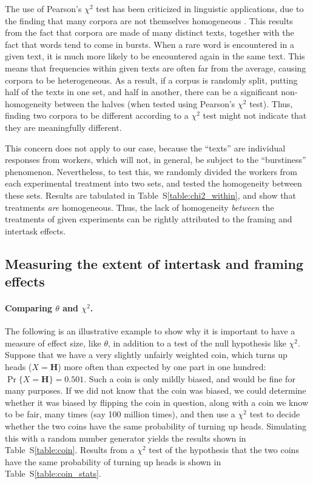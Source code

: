 \documentclass{sigchi}
\begin{document}
The use of Pearson's $\chi^2$ test has been criticized in linguistic 
applications, due to the finding that many corpora are not themselves
homogeneous \cite{kilgarriff1996comparing}.  
This results from the fact that corpora are made of many
distinct texts, together with the fact that words tend to come in bursts.
When a rare word is encountered in a given text, it is much more likely
to be encountered again in the same text. This means that
frequencies within given texts are often far from the average, causing 
corpora to be heterogeneous.
As a result, if a corpus is randomly split, putting half of the texts in one 
set, and half in another, there can be a significant non-homogeneity between 
the halves (when tested using Pearson's $\chi^2$ test).  Thus, finding two
corpora to be different according to a $\chi^2$ test might not 
indicate that they are meaningfully different.

This concern does not apply to our case, because the ``texts'' are 
individual responses from workers, which will not, in general, be subject to 
the ``burstiness'' phenomenon.  Nevertheless, to test this, we randomly 
divided the workers from each experimental treatment into two sets, and 
tested the homogeneity 
between these sets.  Results are tabulated in Table~S\ref{table:chi2_within}, 
and show that treatments 
\textit{are} homogeneous.  Thus, the lack of homogeneity \textit{between} 
the treatments of given experiments can be rightly attributed to the 
framing and intertask effects.

\subsection*{Measuring the extent of intertask and framing effects}

\paragraph{Comparing $\theta$ and $\chi^2$.}
The following is an illustrative example to show why it is important to 
have a measure of effect size, like $\theta$, in addition to a test of the 
null hypothesis like $\chi^2$.
Suppose that we have a very slightly unfairly weighted coin, which turns
up heads ($X=\mathbf{H}$) more often than expected by one part in one hundred:
$\Pr\{X=\mathbf{H}\} = 0.501$. Such a coin is only mildly biased, and would 
be fine for many purposes.  If we did not know that the coin was
biased, we could determine whether it was biased by flipping the coin in 
question, along with a coin we know to be fair, many times 
(say 100 million times), and then use a $\chi^2$ test to decide whether 
the two coins have the same probability of turning up heads.
Simulating this with a random number generator yields the results shown
in Table~S\ref{table:coin}.  Results from a $\chi^2$ test of the
hypothesis that the two coins have the same probability of turning up heads 
is shown in Table~S\ref{table:coin_stats}.
\end{document}
